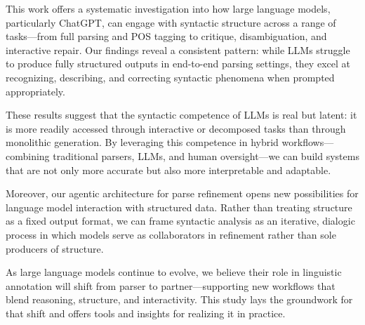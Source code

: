 \label{sec:conclusion}

This work offers a systematic investigation into how large language models, particularly ChatGPT, can engage with syntactic structure across a range of tasks—from full parsing and POS tagging to critique, disambiguation, and interactive repair. Our findings reveal a consistent pattern: while LLMs struggle to produce fully structured outputs in end-to-end parsing settings, they excel at recognizing, describing, and correcting syntactic phenomena when prompted appropriately.

These results suggest that the syntactic competence of LLMs is real but latent: it is more readily accessed through interactive or decomposed tasks than through monolithic generation. By leveraging this competence in hybrid workflows—combining traditional parsers, LLMs, and human oversight—we can build systems that are not only more accurate but also more interpretable and adaptable.

Moreover, our agentic architecture for parse refinement opens new possibilities for language model interaction with structured data. Rather than treating structure as a fixed output format, we can frame syntactic analysis as an iterative, dialogic process in which models serve as collaborators in refinement rather than sole producers of structure.

As large language models continue to evolve, we believe their role in linguistic annotation will shift from parser to partner—supporting new workflows that blend reasoning, structure, and interactivity. This study lays the groundwork for that shift and offers tools and insights for realizing it in practice.

